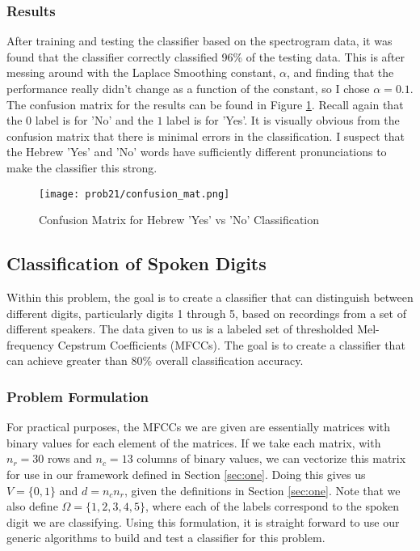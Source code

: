 \documentclass{article}[12pt]
\begin{document}
   \subsubsection{Results}
   After training and testing the classifier based on the spectrogram data, it was found that the classifier correctly classified 96\% of the testing data. This is after messing around with the Laplace Smoothing constant, $\alpha$, and finding that the performance really didn't change as a function of the constant, so I chose $\alpha = 0.1$. The confusion matrix for the results can be found in Figure \ref{fig:cm21}. Recall again that the $0$ label is for 'No' and the $1$ label is for 'Yes'. It is visually obvious from the confusion matrix that there is minimal errors in the classification. I suspect that the Hebrew 'Yes' and 'No' words have sufficiently different pronunciations to make the classifier this strong.
   
   \begin{figure}[!htb]
   	\centering
   	\texttt{[image: prob21/confusion\_mat.png]}
   	\caption{Confusion Matrix for Hebrew 'Yes' vs 'No' Classification}
   	\label{fig:cm21}
   \end{figure}
   
   
   
   \subsection{Classification of Spoken Digits}
   Within this problem, the goal is to create a classifier that can distinguish between different digits, particularly digits 1 through 5, based on recordings from a set of different speakers. The data given to us is a labeled set of thresholded Mel-frequency Cepstrum Coefficients (MFCCs). The goal is to create a classifier that can achieve greater than 80\% overall classification accuracy. 
   
   \subsubsection{Problem Formulation}
   For practical purposes, the MFCCs we are given are essentially matrices with binary values for each element of the matrices. If we take each matrix, with $n_r = 30$ rows and $n_c = 13$ columns of binary values, we can vectorize this matrix for use in our framework defined in Section \ref{sec:one}. Doing this gives us $V = \lbrace 0, 1 \rbrace $ and $d = n_c n_r$, given the definitions in Section \ref{sec:one}. Note that we also define $\Omega = \lbrace 1, 2, 3, 4, 5 \rbrace$, where each of the labels correspond to the spoken digit we are classifying. Using this formulation, it is straight forward to use our generic algorithms to build and test a classifier for this problem.
   
\end{document}
